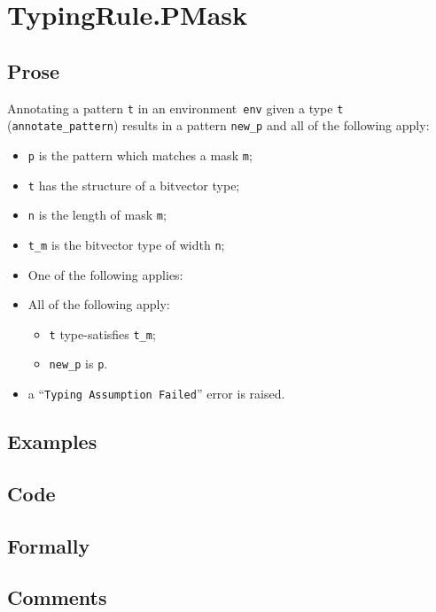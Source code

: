 \documentclass{book}
\begin{document}
\section{TypingRule.PMask \label{sec:TypingRule.PMask}}

  \subsection{Prose}
   Annotating a pattern \texttt{t} in an environment~\texttt{env} given a type \texttt{t} (\texttt{annotate\_pattern}) results in a pattern \texttt{new\_p} and all of the following apply:
   \begin{itemize}
   \item \texttt{p} is the pattern which matches a mask \texttt{m};
   \item \texttt{t} has the structure of a bitvector type;
   \item \texttt{n} is the length of mask \texttt{m};
   \item \texttt{t\_m} is the bitvector type of width \texttt{n};
   \item One of the following applies:
     \item All of the following apply:
       \begin{itemize}
       \item \texttt{t} type-satisfies \texttt{t\_m};
       \item \texttt{new\_p} is \texttt{p}.
       \end{itemize}
     \item a ``\texttt{Typing Assumption Failed}'' error is raised.
   \end{itemize}

  \subsection{Examples}

  \subsection{Code}

  \subsection{Formally}

  \subsection{Comments}
\end{document}
